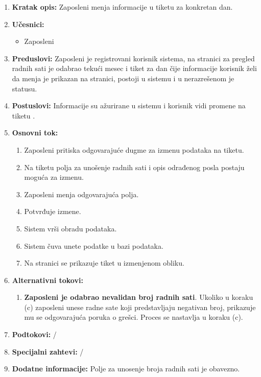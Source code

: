 \documentclass[a4paper]{article}
\begin{document}
\begin{enumerate}
    \item \textbf{Kratak opis:} Zaposleni menja informacije u tiketu za konkretan dan.
    \item \textbf{Učesnici:}
        \begin{itemize}
            \item Zaposleni
        \end{itemize}
    \item \textbf{Preduslovi:} Zaposleni je registrovani korisnik sistema, na stranici za pregled radnih sati je odabrao tekući mesec i tiket za dan čije informacije korisnik želi da menja je prikazan na stranici, postoji u sistemu i u nerazrešenom je statusu.
    \item \textbf{Postuslovi:} Informacije su ažurirane u sistemu i korisnik vidi promene na tiketu .
    \item \textbf{Osnovni tok:}
        \begin{enumerate}
            \item Zaposleni pritiska odgovarajuće dugme za izmenu podataka na tiketu.
            \item Na tiketu polja za unošenje radnih sati i opis odrađenog posla postaju moguća za izmenu.
            \item Zaposleni menja odgovarajuća polja.
            \item Potvrđuje izmene.
            \item Sistem vrši obradu podataka.
            \item Sistem čuva unete podatke u bazi podataka.
            \item Na stranici se prikazuje tiket u izmenjenom obliku.
        \end{enumerate}
    \item \textbf{Alternativni tokovi:}
        \begin{enumerate}
            \item \textbf{Zaposleni je odabrao nevalidan broj radnih sati}. Ukoliko u koraku (c) zaposleni unese radne sate koji predstavljaju negativan broj, prikazuje mu se odgovarajuća poruka o grešci. Proces se nastavlja u koraku (c).
        \end{enumerate}
    \item \textbf{Podtokovi:} /
    \item \textbf{Specijalni zahtevi:} /
    \item \textbf{Dodatne informacije:} Polje za unosenje broja radnih sati je obavezno.
\end{enumerate}
\end{document}
